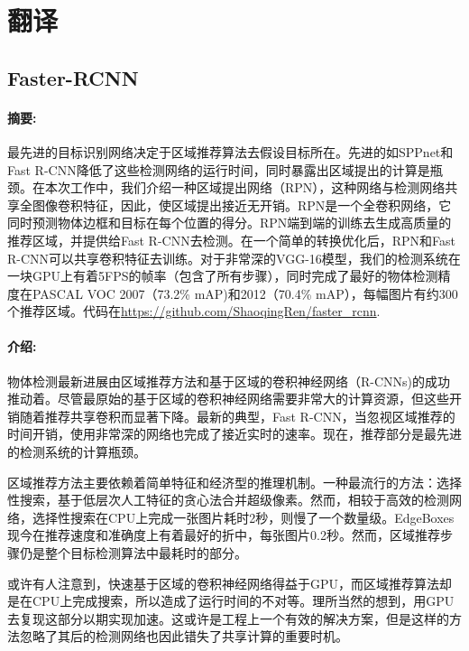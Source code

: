 \documentclass[12pt,a4paper,titlepage]{article}
\begin{document}
\section*{翻译}

\subsection*{Faster-RCNN}

\paragraph {摘要:}
最先进的目标识别网络决定于区域推荐算法去假设目标所在。先进的如SPPnet和Fast R-CNN降低了这些检测网络的运行时间，同时暴露出区域提出的计算是瓶颈。在本次工作中，我们介绍一种区域提出网络（RPN），这种网络与检测网络共享全图像卷积特征，因此，使区域提出接近无开销。RPN是一个全卷积网络，它同时预测物体边框和目标在每个位置的得分。RPN端到端的训练去生成高质量的推荐区域，并提供给Fast R-CNN去检测。在一个简单的转换优化后，RPN和Fast R-CNN可以共享卷积特征去训练。对于非常深的VGG-16模型，我们的检测系统在一块GPU上有着5FPS的帧率（包含了所有步骤），同时完成了最好的物体检测精度在PASCAL VOC 2007（73.2\% mAP)和2012（70.4\% mAP），每幅图片有约300个推荐区域。代码在\url{https://github.com/ShaoqingRen/faster_rcnn}.

\paragraph{介绍:}
物体检测最新进展由区域推荐方法和基于区域的卷积神经网络（R-CNNs)的成功推动着。尽管最原始的基于区域的卷积神经网络需要非常大的计算资源，但这些开销随着推荐共享卷积而显著下降。最新的典型，Fast R-CNN，当忽视区域推荐的时间开销，使用非常深的网络也完成了接近实时的速率。现在，推荐部分是最先进的检测系统的计算瓶颈。\par

区域推荐方法主要依赖着简单特征和经济型的推理机制。一种最流行的方法：选择性搜索，基于低层次人工特征的贪心法合并超级像素。然而，相较于高效的检测网络，选择性搜索在CPU上完成一张图片耗时2秒，则慢了一个数量级。EdgeBoxes现今在推荐速度和准确度上有着最好的折中，每张图片0.2秒。然而，区域推荐步骤仍是整个目标检测算法中最耗时的部分。\par

或许有人注意到，快速基于区域的卷积神经网络得益于GPU，而区域推荐算法却是在CPU上完成搜索，所以造成了运行时间的不对等。理所当然的想到，用GPU去复现这部分以期实现加速。这或许是工程上一个有效的解决方案，但是这样的方法忽略了其后的检测网络也因此错失了共享计算的重要时机。\par
\end{document}
